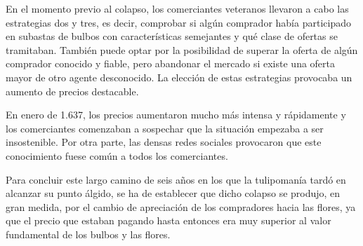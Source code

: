 En el momento previo al colapso, los comerciantes veteranos llevaron a cabo las estrategias dos y tres, es decir, comprobar si algún comprador había participado en subastas de bulbos con características semejantes y qué clase de ofertas se tramitaban. También puede optar por la posibilidad de superar la oferta de algún comprador conocido y fiable, pero abandonar el mercado si existe una oferta mayor de otro agente desconocido. La elección de estas estrategias provocaba un aumento de precios destacable.


En enero de 1.637, los precios aumentaron mucho más intensa y rápidamente y los comerciantes comenzaban a sospechar que la situación empezaba a ser insostenible. Por otra parte, las densas redes sociales provocaron que este conocimiento fuese común a todos los comerciantes.


Para concluir este largo camino de seis años en los que la tulipomanía tardó en alcanzar su punto álgido, se ha de establecer que dicho colapso se produjo, en gran medida, por el cambio de apreciación de los compradores hacia las flores, ya que el precio que estaban pagando hasta entonces era muy superior al valor fundamental de los bulbos y las flores. 


